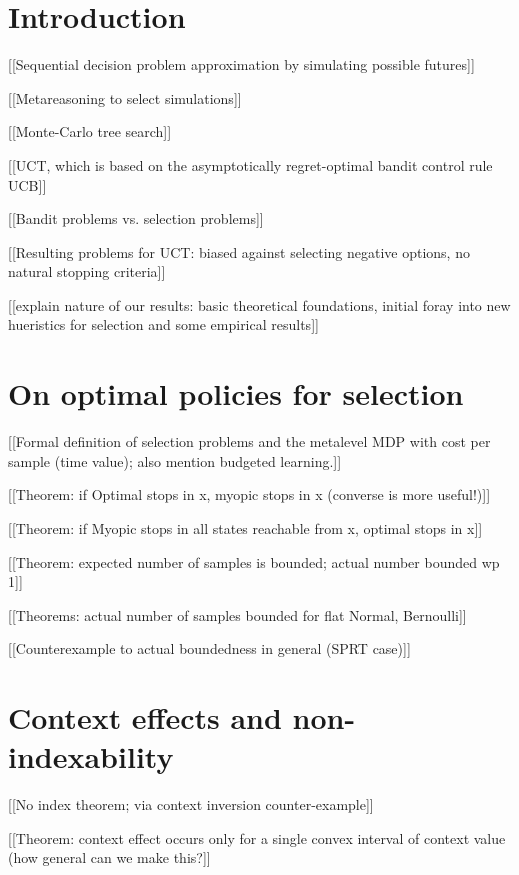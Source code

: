 \documentclass{article}
\begin{document}
\section{Introduction}


[[Sequential decision problem approximation by simulating possible futures]]

[[Metareasoning to select simulations]]

[[Monte-Carlo tree search]]

[[UCT, which is based on the asymptotically regret-optimal bandit control rule UCB]]

[[Bandit problems vs. selection problems]]

[[Resulting problems for UCT: biased against selecting negative options, no natural stopping criteria]]

[[explain nature of our results: basic theoretical foundations,
    initial foray into new hueristics for selection and some empirical
    results]]


\section{On optimal policies for selection}

[[Formal definition of selection problems and the metalevel MDP with cost per sample (time value); also mention budgeted learning.]]

[[Theorem: if Optimal stops in x, myopic stops in x (converse is more useful!)]] 

[[Theorem: if Myopic stops in all states reachable from x, optimal stops in x]]

[[Theorem: expected number of samples is bounded; actual number bounded wp 1]]

[[Theorems: actual number of samples bounded for flat Normal, Bernoulli]]

[[Counterexample to actual boundedness in general (SPRT case)]]

\section{Context effects and non-indexability}

[[No index theorem; via context inversion counter-example]]

[[Theorem: context effect occurs only for a single convex interval of
    context value (how general can we make this?]]
\end{document}
